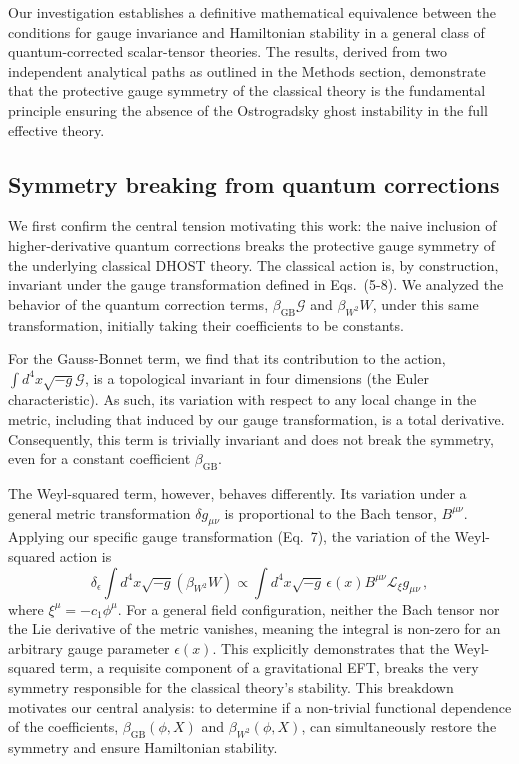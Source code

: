 \documentclass[twocolumn]{aastex631}
\begin{document}
Our investigation establishes a definitive mathematical equivalence between the conditions for gauge invariance and Hamiltonian stability in a general class of quantum-corrected scalar-tensor theories. The results, derived from two independent analytical paths as outlined in the Methods section, demonstrate that the protective gauge symmetry of the classical theory is the fundamental principle ensuring the absence of the Ostrogradsky ghost instability in the full effective theory.

\subsection{Symmetry breaking from quantum corrections}

We first confirm the central tension motivating this work: the naive inclusion of higher-derivative quantum corrections breaks the protective gauge symmetry of the underlying classical DHOST theory. The classical action is, by construction, invariant under the gauge transformation defined in Eqs.~(5-8). We analyzed the behavior of the quantum correction terms, $\beta_{\text{GB}}\mathcal{G}$ and $\beta_{W^2}W$, under this same transformation, initially taking their coefficients to be constants.

For the Gauss-Bonnet term, we find that its contribution to the action, $\int d^4x \sqrt{-g} \mathcal{G}$, is a topological invariant in four dimensions (the Euler characteristic). As such, its variation with respect to any local change in the metric, including that induced by our gauge transformation, is a total derivative. Consequently, this term is trivially invariant and does not break the symmetry, even for a constant coefficient $\beta_{\text{GB}}$.

The Weyl-squared term, however, behaves differently. Its variation under a general metric transformation $\delta g_{\mu\nu}$ is proportional to the Bach tensor, $B^{\mu\nu}$. Applying our specific gauge transformation (Eq.~7), the variation of the Weyl-squared action is
\begin{equation}
    \delta_\epsilon \int d^4x \sqrt{-g} (\beta_{W^2} W) \propto \int d^4x \sqrt{-g} \, \epsilon(x) B^{\mu\nu} \mathcal{L}_{\xi} g_{\mu\nu} \,,
\end{equation}
where $\xi^\mu = -c_1 \phi^\mu$. For a general field configuration, neither the Bach tensor nor the Lie derivative of the metric vanishes, meaning the integral is non-zero for an arbitrary gauge parameter $\epsilon(x)$. This explicitly demonstrates that the Weyl-squared term, a requisite component of a gravitational EFT, breaks the very symmetry responsible for the classical theory's stability. This breakdown motivates our central analysis: to determine if a non-trivial functional dependence of the coefficients, $\beta_{\text{GB}}(\phi, X)$ and $\beta_{W^2}(\phi, X)$, can simultaneously restore the symmetry and ensure Hamiltonian stability.
\end{document}
